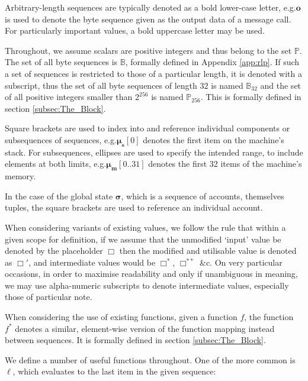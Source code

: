 \documentclass[9pt,oneside]{amsart}
\makeatletter
\newcommand{\linkdest}[1]{\Hy@raisedlink{\hypertarget{#1}{}}}
\newcommand*\eg{e.g.\@\xspace}
\makeatother
\begin{document}
\begin{multicols}{2}
Arbitrary-length sequences are typically denoted as a bold lower-case letter, \eg $\mathbf{o}$ is used to denote the byte sequence given as the output data of a message call. For particularly important values, a bold uppercase letter may be used.

Throughout, we assume scalars are positive integers and thus belong to the set $\mathbb{P}$. The set of all byte sequences is $\mathbb{B}$, formally defined in Appendix \ref{app:rlp}. If such a set of sequences is restricted to those of a particular length, it is denoted with a subscript, thus the set of all byte sequences of length $32$ is named $\mathbb{B}_{32}$ and the set of all positive integers smaller than $2^{256}$ is named $\mathbb{P}_{256}$. This is formally defined in section \hyperlink{block}{\ref{subsec:The_Block}}.

Square brackets are used to index into and reference individual components or subsequences of sequences, \eg $\boldsymbol{\mu}_{\mathbf{s}}[0]$ denotes the first item on the machine's stack. For subsequences, ellipses are used to specify the intended range, to include elements at both limits, \eg $\boldsymbol{\mu}_{\mathbf{m}}[0..31]$ denotes the first 32 items of the machine's memory.

In the case of the global state $\boldsymbol{\sigma}$, which is a sequence of accounts, themselves tuples, the square brackets are used to reference an individual account.

When considering variants of existing values, we follow the rule that within a given scope for definition, if we assume that the unmodified `input' value be denoted by the placeholder $\Box$ then the modified and utilisable value is denoted as $\Box'$, and intermediate values would be $\Box^*$,  $\Box^{**}$ \&c. On very particular occasions, in order to maximise readability and only if unambiguous in meaning, we may use alpha-numeric subscripts to denote intermediate values, especially those of particular note.

When considering the use of existing functions, given a function $f$, the function \hyperlink{general_element_wise_sequence_transformation_f_pow_asterisk}{$f^*$} denotes a similar, element-wise version of the function mapping instead between sequences. It is formally defined in section \hyperlink{block}{\ref{subsec:The_Block}}.

We define a number of useful functions throughout. \linkdest{ell}One of the more common is $\ell$, which evaluates to the last item in the given sequence:


\end{multicols}
\end{document}
